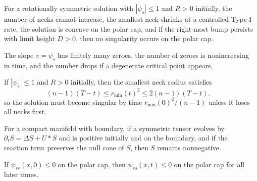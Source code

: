 \begin{proposition}
\label{ch02-prop-neckpinch-profile}

For a rotationally symmetric solution with \(|\psi_s|\le 1\) and \(R>0\)
initially, the number of necks cannot increase, the smallest neck shrinks at a
controlled Type-I rate, the solution is concave on the polar cap, and if the
right-most bump persists with limit height \(D>0\), then no singularity occurs
on the polar cap.
\end{proposition}

\begin{lemma}
\label{ch02-lem-neckpinch-zeroes}

The slope \(v=\psi_s\) has finitely many zeroes, the number of zeroes is
nonincreasing in time, and the number drops if a degenerate critical point
appears.
\end{lemma}

\begin{lemma}
\label{ch02-lem-neckpinch-neck-rate}

If \(|\psi_s|\le 1\) and \(R>0\) initially, then the smallest neck radius
satisfies
\[
(n-1)(T-t)\le r_{\min}(t)^2\le 2(n-1)(T-t),
\]
so the solution must become singular by time \(r_{\min}(0)^2/(n-1)\) unless it
loses all necks first.
\end{lemma}

\begin{lemma}
\label{ch02-lem-tensor-maximum-boundary}

For a compact manifold with boundary, if a symmetric tensor evolves by
\(\partial_t S=\Delta S+U*S\) and is positive initially and on the boundary, and
if the reaction term preserves the null cone of \(S\), then \(S\) remains
nonnegative.
\end{lemma}

\begin{lemma}
\label{ch02-lem-neckpinch-concavity-polar-cap}

If \(\psi_{ss}(x,0)\le 0\) on the polar cap, then \(\psi_{ss}(x,t)\le 0\) on
the polar cap for all later times.
\end{lemma}

